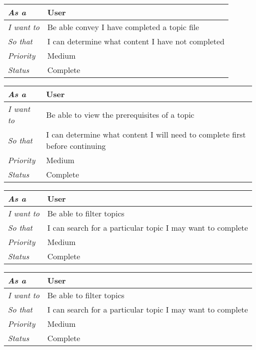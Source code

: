\begin{table}[h!]
    \begin{tabular}{|l|l|}
        \hline
        \textit{As a} & User \\ \hline
        \textit{I want to} & Be able convey I have completed a topic file \\ \hline
        \textit{So that} & I can determine what content I have not completed\\ \hline
        \textit{Priority} & {\color[HTML]{FE996B} Medium} \\ \hline
        \textit{Status} & Complete \\ \hline
    \end{tabular}
\end{table}

\begin{table}[h!]
    \begin{tabular}{|l|l|}
        \hline
        \textit{As a} & User \\ \hline
        \textit{I want to} & Be able to view the prerequisites of a topic \\ \hline
        \textit{So that} & I can determine what content I will need to complete first before continuing\\ \hline
        \textit{Priority} & {\color[HTML]{FE996B} Medium} \\ \hline
        \textit{Status} & Complete \\ \hline
    \end{tabular}
\end{table}

\begin{table}[h!]
    \begin{tabular}{|l|l|}
        \hline
        \textit{As a} & User \\ \hline
        \textit{I want to} & Be able to filter topics \\ \hline
        \textit{So that} & I can search for a particular topic I may want to complete\\ \hline
        \textit{Priority} & {\color[HTML]{FE996B} Medium} \\ \hline
        \textit{Status} & Complete \\ \hline
    \end{tabular}
\end{table}

\begin{table}[h!]
    \begin{tabular}{|l|l|}
        \hline
        \textit{As a} & User \\ \hline
        \textit{I want to} & Be able to filter topics \\ \hline
        \textit{So that} & I can search for a particular topic I may want to complete\\ \hline
        \textit{Priority} & {\color[HTML]{FE996B} Medium} \\ \hline
        \textit{Status} & Complete \\ \hline
    \end{tabular}
\end{table}

